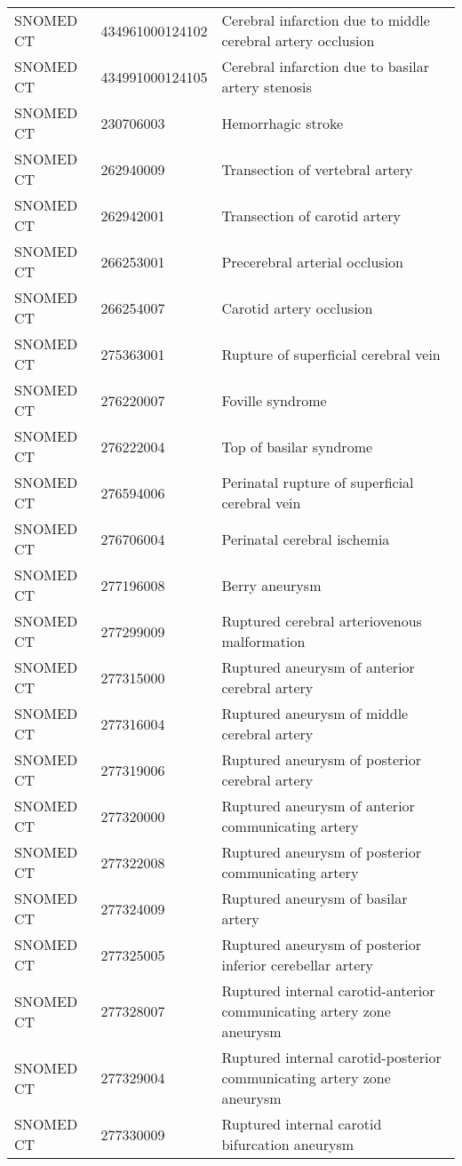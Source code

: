 \begin{longtable}{p{}p{}p{}}
  SNOMED CT & 434961000124102 & Cerebral infarction due to middle cerebral artery occlusion \\ 
  SNOMED CT & 434991000124105 & Cerebral infarction due to basilar artery stenosis \\ 
  SNOMED CT & 230706003 & Hemorrhagic stroke \\ 
  SNOMED CT & 262940009 & Transection of vertebral artery \\ 
  SNOMED CT & 262942001 & Transection of carotid artery \\ 
  SNOMED CT & 266253001 & Precerebral arterial occlusion \\ 
  SNOMED CT & 266254007 & Carotid artery occlusion \\ 
  SNOMED CT & 275363001 & Rupture of superficial cerebral vein \\ 
  SNOMED CT & 276220007 & Foville syndrome \\ 
  SNOMED CT & 276222004 & Top of basilar syndrome \\ 
  SNOMED CT & 276594006 & Perinatal rupture of superficial cerebral vein \\ 
  SNOMED CT & 276706004 & Perinatal cerebral ischemia \\ 
  SNOMED CT & 277196008 & Berry aneurysm \\ 
  SNOMED CT & 277299009 & Ruptured cerebral arteriovenous malformation \\ 
  SNOMED CT & 277315000 & Ruptured aneurysm of anterior cerebral artery \\ 
  SNOMED CT & 277316004 & Ruptured aneurysm of middle cerebral artery \\ 
  SNOMED CT & 277319006 & Ruptured aneurysm of posterior cerebral artery \\ 
  SNOMED CT & 277320000 & Ruptured aneurysm of anterior communicating artery \\ 
  SNOMED CT & 277322008 & Ruptured aneurysm of posterior communicating artery \\ 
  SNOMED CT & 277324009 & Ruptured aneurysm of basilar artery \\ 
  SNOMED CT & 277325005 & Ruptured aneurysm of posterior inferior cerebellar artery \\ 
  SNOMED CT & 277328007 & Ruptured internal carotid-anterior communicating artery zone aneurysm \\ 
  SNOMED CT & 277329004 & Ruptured internal carotid-posterior communicating artery zone aneurysm \\ 
  SNOMED CT & 277330009 & Ruptured internal carotid bifurcation aneurysm \\ 

\end{longtable}
